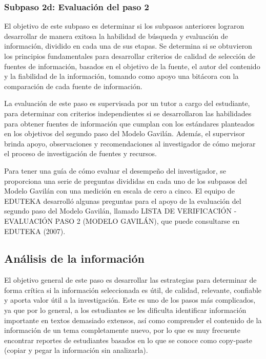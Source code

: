 
\subsubsection{Subpaso 2d: Evaluación del paso 2}
\label{secPaso2dCap2}

El objetivo de este subpaso es determinar si los subpasos anteriores lograron desarrollar de manera exitosa la habilidad de búsqueda y evaluación de información, dividido en cada una de sus etapas. Se determina si se obtuvieron los principios fundamentales para desarrollar criterios de calidad de selección de fuentes de información, basados en el objetivo de la fuente, el autor del contenido y la fiabilidad de la información, tomando como apoyo una bitácora con la comparación de cada fuente de información.

La evaluación de este paso es supervisada por un tutor a cargo del estudiante, para determinar con criterios independientes si se desarrollaron las habilidades para obtener fuentes de información que cumplan con los estándares planteados en los objetivos del segundo paso del Modelo Gavilán. Además, el supervisor brinda apoyo, observaciones y recomendaciones al investigador de cómo mejorar el proceso de investigación de fuentes y recursos.

Para tener una guía de cómo evaluar el desempeño del investigador, se proporciona una serie de preguntas divididas en cada uno de los subpasos del Modelo Gavilán con una medición en escala de cero a cinco. El equipo de EDUTEKA desarrolló algunas preguntas para el apoyo de la evaluación del segundo paso del Modelo Gavilán, llamado LISTA DE VERIFICACIÓN - EVALUACIÓN PASO 2 (MODELO GAVILÁN), que puede consultarse en EDUTEKA (2007).


\subsection{Análisis de la información}
\label{secPaso3Cap2}

El objetivo general de este paso es desarrollar las estrategias para determinar de forma crítica si la información seleccionada es útil, de calidad, relevante, confiable y aporta valor útil a la investigación. Este es uno de los pasos más complicados, ya que por lo general, a los estudiantes se les dificulta identificar información importante en textos demasiado extensos, así como comprender el contenido de la información de un tema completamente nuevo, por lo que es muy frecuente encontrar reportes de estudiantes basados en lo que se conoce como copy-paste (copiar y pegar la información sin analizarla).

